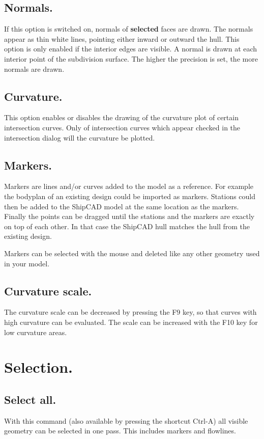 \documentclass[12pt]{article}
\begin{document}
\subsection{Normals.}
If this option is switched on, normals of \textbf{selected} faces are
drawn. The normals appear as thin white lines, pointing either inward
or outward the hull. This option is only enabled if the interior edges
are visible. A normal is drawn at each interior point of the
subdivision surface. The higher the precision is set, the more normals
are drawn.

\subsection{Curvature.}
This option enables or disables the drawing of the curvature plot of
certain intersection curves. Only of intersection curves which appear
checked in the intersection dialog will the curvature be plotted.

\subsection{Markers.} \label{vis-markers}
Markers are lines and/or curves added to the model as a reference. For
example the bodyplan of an existing design could be imported as
markers. Stations could then be added to the ShipCAD model at the same
location as the markers. Finally the points can be dragged until the
stations and the markers are exactly on top of each other. In that
case the ShipCAD hull matches the hull from the existing design.

Markers can be selected with the mouse and deleted like any other
geometry used in your model.

\subsection{Curvature scale.}
The curvature scale can be decreased by pressing the F9 key, so that
curves with high curvature can be evaluated. The scale can be
increased with the F10 key for low curvature areas.

\pagebreak

\section{Selection.}

\subsection{Select all.}
With this command (also available by pressing the shortcut Ctrl-A) all visible geometry can be
selected in one pass. This includes markers and flowlines.
\end{document}
